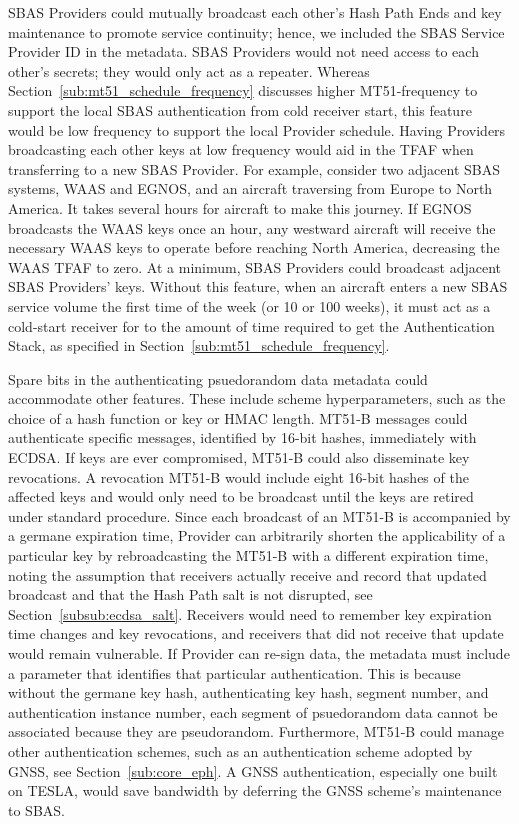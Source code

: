 \documentclass[letterpaper,times]{IONconf/IONconf}
\begin{document}
		SBAS Providers could mutually broadcast each other's Hash Path Ends and key maintenance to promote service continuity; hence, we included the SBAS Service Provider ID in the metadata.
		SBAS Providers would not need access to each other's secrets; they would only act as a repeater.
		Whereas Section~\ref{sub:mt51_schedule_frequency} discusses higher MT51-frequency to support the local SBAS authentication from cold receiver start, this feature would be low frequency to support the local Provider schedule.
		Having Providers broadcasting each other keys at low frequency would aid in the TFAF when transferring to a new SBAS Provider.
		For example, consider two adjacent SBAS systems, WAAS and EGNOS, and an aircraft traversing from Europe to North America.
		It takes several hours for aircraft to make this journey.
		If EGNOS broadcasts the WAAS keys once an hour, any westward aircraft will receive the necessary WAAS keys to operate before reaching North America, decreasing the WAAS TFAF to zero. 
		At a minimum, SBAS Providers could broadcast adjacent SBAS Providers' keys.
		Without this feature, when an aircraft enters a new SBAS service volume the first time of the week (or 10 or 100 weeks), it must act as a cold-start receiver for to the amount of time required to get the Authentication Stack, as specified in Section~\ref{sub:mt51_schedule_frequency}.

		Spare bits in the authenticating psuedorandom data metadata could accommodate other features.
		These include scheme hyperparameters, such as the choice of a hash function or key or HMAC length.
		MT51-B messages could authenticate specific messages, identified by 16-bit hashes, immediately with ECDSA.
		If keys are ever compromised, MT51-B could also disseminate key revocations.
		A revocation MT51-B would include eight 16-bit hashes of the affected keys and would only need to be broadcast until the keys are retired under standard procedure.
		Since each broadcast of an MT51-B is accompanied by a germane expiration time, Provider can arbitrarily shorten the applicability of a particular key by rebroadcasting the MT51-B with a different expiration time, noting the assumption that receivers actually receive and record that updated broadcast and that the Hash Path salt is not disrupted, see Section~\ref{subsub:ecdsa_salt}.
		Receivers would need to remember key expiration time changes and key revocations, and receivers that did not receive that update would remain vulnerable.
		If Provider can re-sign data, the metadata must include a parameter that identifies that particular authentication.
		This is because without the germane key hash, authenticating key hash, segment number, and authentication instance number, each segment of psuedorandom data cannot be associated because they are pseudorandom.
		Furthermore, MT51-B could manage other authentication schemes, such as an authentication scheme adopted by GNSS, see Section~\ref{sub:core_eph}.
		A GNSS authentication, especially one built on TESLA, would save bandwidth by deferring the GNSS scheme's maintenance to SBAS.
\end{document}
